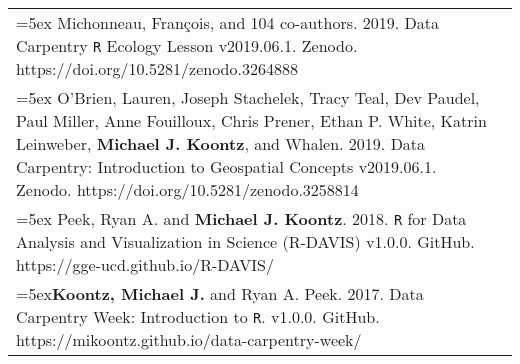 \documentclass[10pt,english]{article}
\providecommand{\tabularnewline}{\\}
\begin{document}
\renewcommand{\arraystretch}{1.2}
\begin{tabularx}{\textwidth}{@{}>{\raggedright}p{5.25in} >{\raggedleft}X@{}}

\hangindent=5ex Michonneau, Fran\c{c}ois, and 104 co-authors. 2019. Data Carpentry \texttt{R} Ecology Lesson v2019.06.1. Zenodo. https://doi.org/10.5281/zenodo.3264888 & 2019 \tabularnewline

\hangindent=5ex O'Brien, Lauren, Joseph Stachelek, Tracy Teal, Dev Paudel, Paul Miller, Anne Fouilloux, Chris Prener, Ethan P. White, Katrin Leinweber, \textbf{Michael J. Koontz}, and Whalen. 2019. Data Carpentry: Introduction to Geospatial Concepts v2019.06.1. Zenodo. https://doi.org/10.5281/zenodo.3258814 & 2019 \tabularnewline

\hangindent=5ex Peek, Ryan A. and \textbf{Michael J. Koontz}. 2018. \texttt{R} for Data Analysis and Visualization in Science (R-DAVIS) v1.0.0. GitHub. https://gge-ucd.github.io/R-DAVIS/ & 2018 \tabularnewline


\hangindent=5ex\textbf{Koontz, Michael J.} and Ryan A. Peek. 2017. Data Carpentry Week: Introduction to \texttt{R}. v1.0.0. GitHub. https://mikoontz.github.io/data-carpentry-week/ & 2017 \tabularnewline

\end{tabularx}
\end{document}
